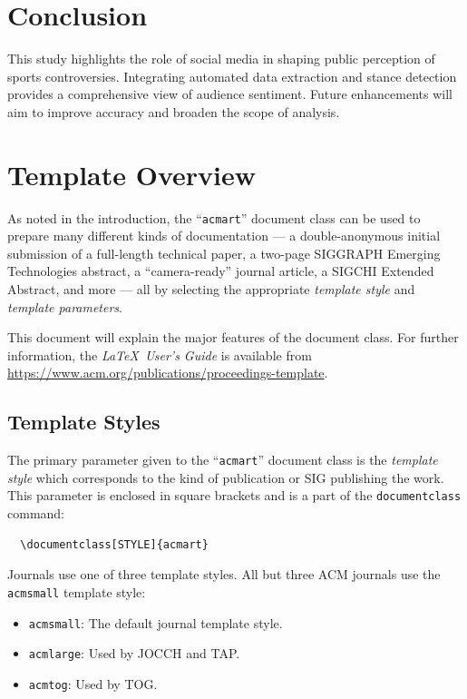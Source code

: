 \documentclass[sigconf, review]{acmart}
\begin{document}
\section{Conclusion}
This study highlights the role of social media in shaping public perception of sports controversies. Integrating automated data extraction and stance detection provides a comprehensive view of audience sentiment. Future enhancements will aim to improve accuracy and broaden the scope of analysis.



\section{Template Overview}
As noted in the introduction, the ``\verb|acmart|'' document class can
be used to prepare many different kinds of documentation --- a
double-anonymous initial submission of a full-length technical paper, a
two-page SIGGRAPH Emerging Technologies abstract, a ``camera-ready''
journal article, a SIGCHI Extended Abstract, and more --- all by
selecting the appropriate {\itshape template style} and {\itshape
  template parameters}.

This document will explain the major features of the document
class. For further information, the {\itshape \LaTeX\ User's Guide} is
available from
\url{https://www.acm.org/publications/proceedings-template}.

\subsection{Template Styles}

The primary parameter given to the ``\verb|acmart|'' document class is
the {\itshape template style} which corresponds to the kind of publication
or SIG publishing the work. This parameter is enclosed in square
brackets and is a part of the {\verb|documentclass|} command:
\begin{verbatim}
  \documentclass[STYLE]{acmart}
\end{verbatim}

Journals use one of three template styles. All but three ACM journals
use the {\verb|acmsmall|} template style:
\begin{itemize}
\item {\texttt{acmsmall}}: The default journal template style.
\item {\texttt{acmlarge}}: Used by JOCCH and TAP.
\item {\texttt{acmtog}}: Used by TOG.
\end{itemize}
\end{document}
